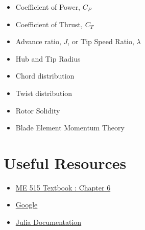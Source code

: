 \documentclass[12pt]{article}
\begin{document}
\begin{multicols}{2}
	\begin{itemize}
		\item Coefficient of Power, $C_P$
		\item Coefficient of Thrust, $C_T$
		\item Advance ratio, $J$, or Tip Speed Ratio, $\lambda$
		\item Hub and Tip Radius
		\item Chord distribution
		\item Twist distribution
		\item Rotor Solidity
		\item Blade Element Momentum Theory
	\end{itemize}
\end{multicols}


\section{Useful Resources}
\begin{itemize}
   		\item \href{https://byu.box.com/shared/static/ywfayozbj3sr2ot6b32u8nqk5brqvurt.pdf}{ME 515 Textbook : Chapter 6}
   		\item \href{https://www.google.com/}{Google}
   		\item \href{https://docs.julialang.org/en/v1/}{Julia Documentation}
\end{itemize}
	
\end{document}
